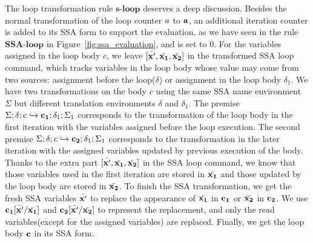 The loop transformation rule $\textbf{s-loop}$ deserves a deep discussion. Besides the normal transformation of the loop counter $a$ to ${\bf{{a}}}$, an additional iteration counter is added to its SSA form to support the evaluation, as we have seen in the rule $\textbf{SSA-loop}$ in Figure~\ref{fig:ssa_evaluation}, and is set to $0$.
For the variables assigned in the loop body $c$, we leave $ [\bar{{\bf{{x'}}}}, \bar{{\bf{{x_1}}}}, \bar{{\bf{{x_2}}}}]$ in the transformed SSA loop command, which tracks variables in the loop body whose value may come from two sources: assignment before the loop($\delta$) or assignment in the loop body $\delta_1$. We have two transformations on the body $c$ using the same SSA name environment $\Sigma$ but different translation environments $\delta$ and $\delta_1$.
The premise $\Sigma; \delta; c \hookrightarrow {\bf{{c_1}}}; \delta_1 ; \Sigma_1 $ corresponds to the transformation of the loop body in the first iteration with the variables assigned before the loop execution. The second premise $\Sigma; \delta; c \hookrightarrow {\bf{{c_2}}}; \delta_1 ; \Sigma_1 $ corresponds to the transformation in the later iteration with the assigned variables updated by previous execution of the body.
Thanks to the extra part $ [\bar{{\bf{{x'}}}}, \bar{{\bf{{x_1}}}}, \bar{{\bf{{x_2}}}}]$ in the SSA loop command, we know that those variables used in the first iteration are stored in $\bar{{\bf{{x_1}}}}$ and those updated by the loop body are stored in $\bar{{\bf{{x_2}}}}$. To finish the SSA transformation, we get the fresh SSA variables $\bar{{\bf{{x'}}}}$ to replace the appearance of $\bar{{\bf{{x_1}}}}$ in  ${\bf{{c_1}}}$ or $\bar{{\bf{{x_2}}}}$ in ${\bf{{c_2}}}$. We use ${\bf{{c_1}}}[\bar{{\bf{{x'}}}}/ \bar{{\bf{{x_1}}}}]$ and ${\bf{{c_2}}}[\bar{{\bf{{x'}}}}/ \bar{{\bf{{x_2}}}}]$ to represent the replacement, and only the read variables(except for the assigned variables) are replaced. 
Finally, we get the loop body ${\bf{{c}}}$ in its SSA form.
